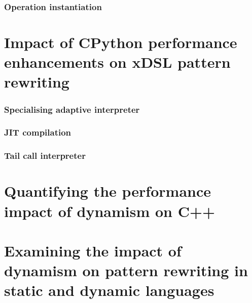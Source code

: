 \subsection{Operation instantiation}





\chapter{Impact of CPython performance enhancements on xDSL pattern rewriting}

\subsection{Specialising adaptive interpreter}

\subsection{JIT compilation}

\subsection{Tail call interpreter}




\chapter{Quantifying the performance impact of dynamism on C++}





\chapter{Examining the impact of dynamism on pattern rewriting in static and dynamic languages}






